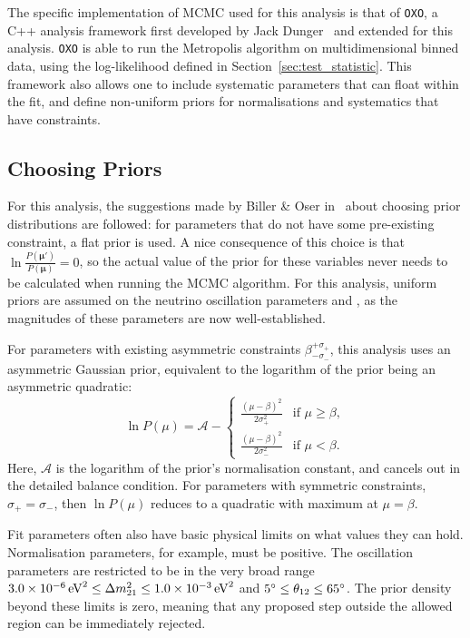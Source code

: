 The specific implementation of MCMC used for this analysis is that of \texttt{OXO}, a C++ analysis framework first developed by Jack Dunger~\cite{dungerTopologicalTimeBased2018} and extended for this analysis. %
\texttt{OXO} is able to run the Metropolis algorithm on multidimensional binned data, using the log-likelihood defined in Section~\ref{sec:test_statistic}. This framework also allows one to include systematic parameters that can float within the fit, and define non-uniform priors for normalisations and systematics that have constraints.

\subsection{Choosing Priors}
For this analysis, the suggestions made by Biller \& Oser in~\cite{billerAnotherLookConfidence2015} %
about choosing prior distributions are followed: for parameters that do not have some pre-existing constraint, a flat prior is used. A nice consequence of this choice is that $\ln{\frac{P\left(\bm{\mu}'\right)}{P\left(\bm{\mu}\right)}} = 0$, so the actual value of the prior for these variables never needs to be calculated when running the MCMC algorithm. For this analysis, uniform priors are assumed on the neutrino oscillation parameters \dmsq{} and \tonetwo{}, as the magnitudes of these parameters are now well-established.

For parameters with existing asymmetric constraints $\beta^{+\sigma_{+}}_{-\sigma_{-}}$, this analysis uses an asymmetric Gaussian prior, equivalent to the logarithm of the prior being an asymmetric quadratic:
\begin{equation}
    \ln{P\left(\mu\right)} = \mathcal{A} -
    \begin{cases}
        \frac{\left(\mu-\beta\right)^{2}}{2\sigma_{+}^{2}} & \textrm{if } \mu\geq\beta,\\
        \frac{\left(\mu-\beta\right)^{2}}{2\sigma_{-}^{2}} & \textrm{if } \mu<\beta.
    \end{cases}
\end{equation}
Here, $\mathcal{A}$ is the logarithm of the prior's normalisation constant, and cancels out in the detailed balance condition. For parameters with symmetric constraints, $\sigma_{+}=\sigma_{-}$, then $\ln{P\left(\mu\right)}$ reduces to a quadratic with maximum at $\mu = \beta$.

Fit parameters often also have basic physical limits on what values they can hold. Normalisation parameters, for example, must be positive. The oscillation parameters are restricted to be in the very broad range $\SI{3.0e-6}{\eV\squared}\leq\dmsq{}\leq\SI{1.0e-3}{\eV\squared}$ and $\ang{5}\leq\theta_{12}{}\leq\ang{65}$. The prior density beyond these limits is zero, meaning that any proposed step outside the allowed region can be immediately rejected.

